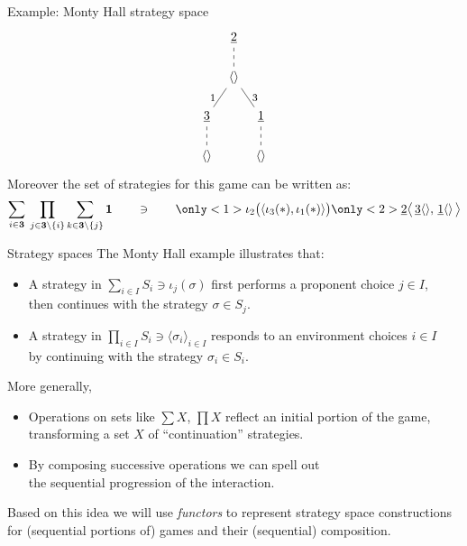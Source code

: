 \documentclass[aspectratio=1610,mathserif]{beamer}
\begin{document}
\begin{frame}[fragile]{Example: Monty Hall strategy space}
\[\begin{tikzpicture}
      [baseline=(B.base),
       level distance=11mm,
      ]
      \node {$\uline2$} child {
        node {$\langle \rangle$}
        child {
          node {$\uline3$}
          child { node {$\langle \rangle$} edge from parent [dashed] }
          edge from parent [solid] node[left] (B) {\footnotesize $1$}
        }
        child {
          node {$\uline1$}
          child { node {$\langle \rangle$} edge from parent [dashed] }
          edge from parent [solid] node[right] {\footnotesize $3$}
        }
        edge from parent [dashed]
      };
    \end{tikzpicture}
  \]
  Moreover the set of strategies for this game can be written as:
  \[
    \sum_{i \in \mathbf{3}} \:
    \prod_{j \in \mathbf{3} \setminus \{ i \}}
    \sum_{k \in \mathbf{3} \setminus \{ j \}}
    \mathbf{1}
    \qquad \ni \qquad
    \only<1>{
      \iota_2 \bigl( \langle \iota_3(*), \iota_1(*) \rangle \bigr)
    }
    \only<2>{
      \uline{2} \bigl\langle \,
        \uline{3} \langle \rangle, \,
        \uline{1} \langle \rangle \,
      \bigr\rangle
    }
  \]
\end{frame}

\begin{frame}{Strategy spaces} %
  The Monty Hall example illustrates that:
  \begin{itemize}
    \item A strategy in $\sum_{i\in I} S_i \ni \iota_j(\sigma)$
      first performs a proponent choice $j \in I$, \\
      then continues with the strategy $\sigma \in S_j$.
    \item A strategy in $\prod_{i \in I} S_i \ni \langle \sigma_i \rangle_{i \in I}$
      responds to an environment choices $i \in I$ \\
      by continuing with the strategy $\sigma_i \in S_i$.
  \end{itemize}
  \pause
  \vspace{1ex}
  More generally,
  \begin{itemize}
    \item Operations on sets like $\sum X$, $\prod X$
      reflect an initial portion of the game,
      transforming a set $X$ of ``continuation'' strategies.
    \item By composing successive operations
      we can spell out \\ the sequential progression
      of the interaction.
  \end{itemize}
  Based on this idea we will use \emph{functors}
  to represent strategy space constructions for
  (sequential portions of) games
  and their (sequential) composition.
\end{frame}
\end{document}
